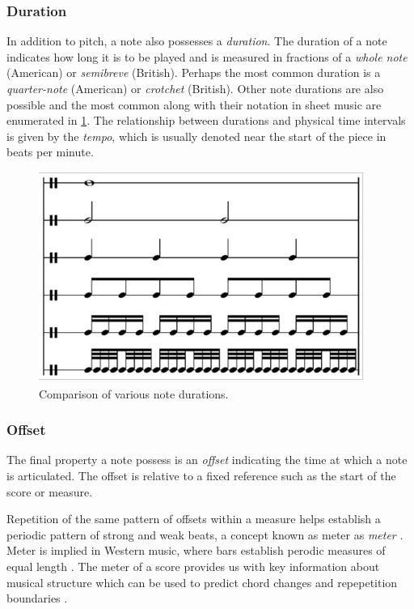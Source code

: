 \subsubsection{Duration}

In addition to pitch, a note also possesses a \emph{duration}. The duration of
a note indicates how long it is to be played and is measured in fractions of a
\emph{whole note} (American) or \emph{semibreve} (British). Perhaps the most
common duration is a \emph{quarter-note} (American) or \emph{crotchet}
(British). Other note durations are also possible and the most common along
with their notation in sheet music are enumerated in
\cref{fig:note-durations}. The relationship between durations and
physical time intervals is given by the \emph{tempo}, which is usually
denoted near the start of the piece in beats per minute.

\begin{figure}[htpb]
    \centering
    \includegraphics[width=0.6\linewidth]{note-durations.png}
    \caption{Comparison of various note durations.}
    \label{fig:note-durations}
\end{figure}

\subsubsection{Offset}


The final property a note possess is an \emph{offset} indicating the time
at which a note is articulated. The offset is relative to a fixed
reference such as the start of the score or measure.


Repetition of the same pattern of offsets within a measure helps establish a
periodic pattern of strong and weak beats, a concept known as meter as
\emph{meter} \cite{grove-meter}. Meter is implied in Western music, where bars establish perodic
measures of equal length \citep{handel1993listening}. The meter of a score
provides us with key information about musical structure which can be used to
predict chord changes and repepetition boundaries \citep{cooper1963rhythmic}.

